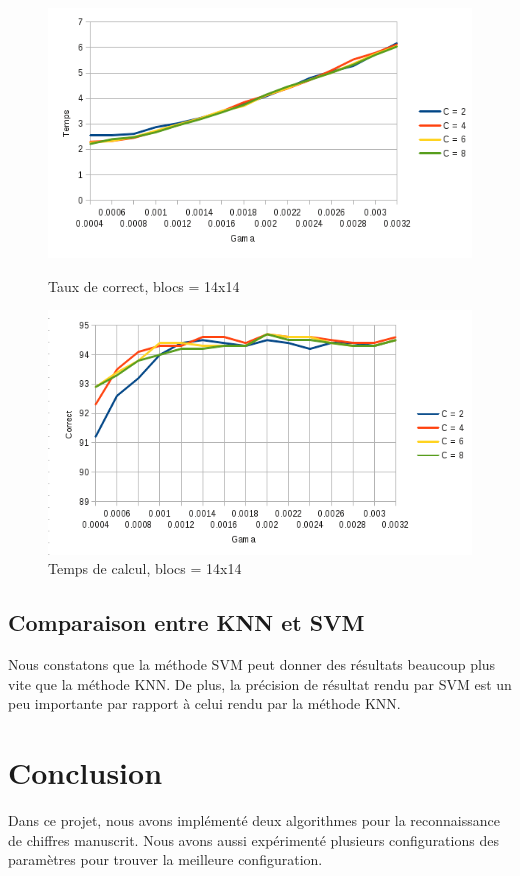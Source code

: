 \documentclass[]{article}   %
\begin{document}
\begin{figure}[!htb]
  \includegraphics[width=\linewidth]{images/graphique4.png}
  \caption{Taux de correct, blocs = 14x14}\label{fig:awesome_image2}
\endminipage\hfill
{}
  \includegraphics[width=\linewidth]{images/graphique5.png}
  \caption{Temps de calcul, blocs = 14x14}\label{fig:awesome_image3}
\endminipage\hfill
\end{figure}

\subsection{Comparaison entre KNN et SVM}
Nous constatons que la méthode SVM peut donner des résultats beaucoup plus vite que la 
méthode KNN. De plus, la précision de résultat rendu par SVM est un peu importante par 
rapport à celui rendu par la méthode KNN.



\section{Conclusion}
Dans ce projet, nous avons implémenté deux algorithmes pour la reconnaissance de chiffres 
manuscrit. Nous avons aussi expérimenté plusieurs configurations des paramètres pour 
trouver la meilleure configuration.
\end{document}
